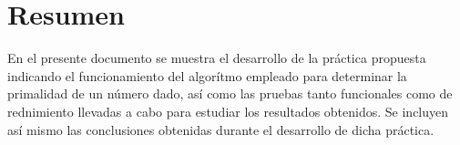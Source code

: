 \part{Resumen}
En el presente documento se muestra el desarrollo de la práctica propuesta indicando el funcionamiento del algorítmo empleado para determinar la primalidad de un número dado, así como las pruebas tanto funcionales como de rednimiento llevadas a cabo para estudiar los resultados obtenidos. 
Se incluyen así mismo las conclusiones obtenidas durante el desarrollo de dicha práctica.

\newpage
